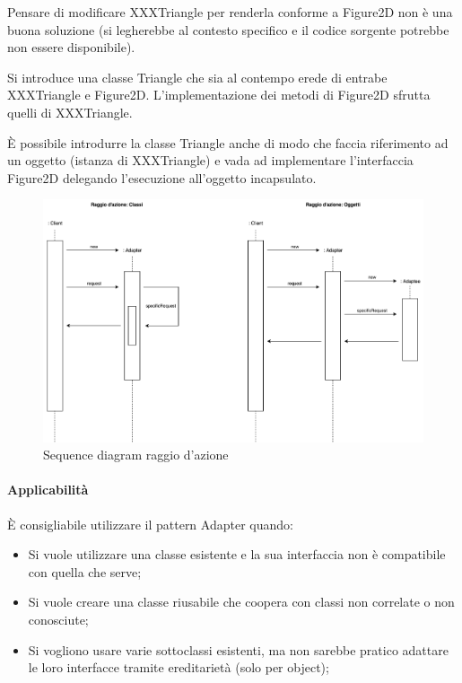 Pensare di modificare XXXTriangle per renderla conforme a Figure2D non è una buona soluzione (si legherebbe al contesto specifico e il codice sorgente potrebbe non essere disponibile).

Si introduce una classe Triangle che sia al contempo erede di entrabe XXXTriangle e Figure2D. L'implementazione dei metodi di Figure2D sfrutta quelli di XXXTriangle.

È possibile introdurre la classe Triangle anche di modo che faccia riferimento ad un oggetto (istanza di XXXTriangle) e vada ad implementare l'interfaccia Figure2D delegando l'esecuzione all'oggetto incapsulato.

\begin{figure}[H]
    \centering
    \includegraphics[width=0.75\linewidth]{assets/pattern/adapter/adapter-sequence.drawio.png}
    \caption{Sequence diagram raggio d'azione}
\end{figure}

\paragraph{Applicabilità} È consigliabile utilizzare il pattern Adapter quando:
\begin{itemize}
    \item Si vuole utilizzare una classe esistente e la sua interfaccia non è compatibile con quella che serve;
    \item Si vuole creare una classe riusabile che coopera con classi non correlate o non conosciute;
    \item Si vogliono usare varie sottoclassi esistenti, ma non sarebbe pratico adattare le loro interfacce tramite ereditarietà (solo per object);
\end{itemize}

